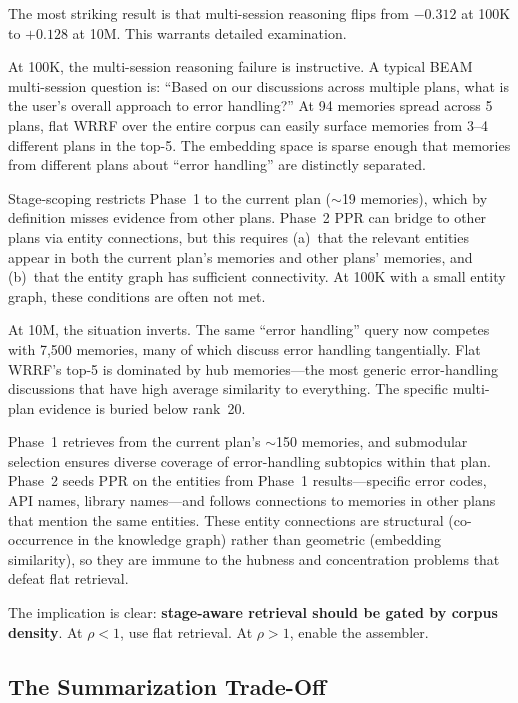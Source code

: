 \documentclass[11pt]{article}
\begin{document}
The most striking result is that multi-session reasoning flips from
$-0.312$ at 100K to $+0.128$ at 10M.  This warrants detailed
examination.

At 100K, the multi-session reasoning failure is instructive.  A
typical BEAM multi-session question is: ``Based on our discussions
across multiple plans, what is the user's overall approach to error
handling?''  At 94 memories spread across 5 plans, flat WRRF over the
entire corpus can easily surface memories from 3--4 different plans in
the top-5.  The embedding space is sparse enough that memories from
different plans about ``error handling'' are distinctly separated.

Stage-scoping restricts Phase~1 to the current plan ($\sim$19
memories), which by definition misses evidence from other plans.
Phase~2 PPR can bridge to other plans via entity connections, but
this requires (a)~that the relevant entities appear in both the
current plan's memories and other plans' memories, and (b)~that the
entity graph has sufficient connectivity.  At 100K with a small entity
graph, these conditions are often not met.

At 10M, the situation inverts.  The same ``error handling'' query now
competes with 7,500 memories, many of which discuss error handling
tangentially.  Flat WRRF's top-5 is dominated by hub memories---the
most generic error-handling discussions that have high average
similarity to everything.  The specific multi-plan evidence is buried
below rank~20.

Phase~1 retrieves from the current plan's $\sim$150 memories, and
submodular selection ensures diverse coverage of error-handling
subtopics within that plan.  Phase~2 seeds PPR on the entities from
Phase~1 results---specific error codes, API names, library
names---and follows connections to memories in other plans that mention
the same entities.  These entity connections are structural
(co-occurrence in the knowledge graph) rather than geometric
(embedding similarity), so they are immune to the hubness and
concentration problems that defeat flat retrieval.

The implication is clear: \textbf{stage-aware retrieval should be
gated by corpus density}.  At $\rho < 1$, use flat retrieval.  At
$\rho > 1$, enable the assembler.

\subsection{The Summarization Trade-Off}
\label{sec:summarization-tradeoff}
\end{document}
